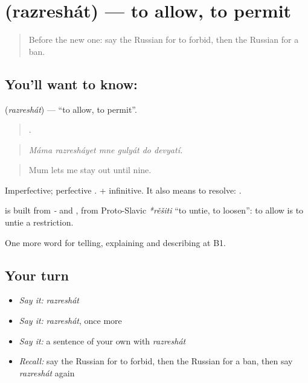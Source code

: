 \section[\texorpdfstring{\ru{разрешать} (razreshát)}{разрешать (razreshát)}]{ (razreshát) — to allow, to permit}

\label{lesson:RU-C389-razreshat}



\begin{quote}
Before the new one: say the Russian for to forbid, then the Russian for a ban.
\end{quote}

\subsection*{You'll want to know: }
\textbf{} (\emph{razreshát}) — \textquotedblleft{}to allow, to permit\textquotedblright{}.

\begin{quote}
     .
\end{quote}

\begin{quote}
\emph{Máma razresháyet mne gulyát do devyatí.}
\end{quote}

\begin{quote}
Mum lets me stay out until nine.
\end{quote}

Imperfective; perfective \emph{}. \emph{ } + infinitive. It also means to resolve: \emph{ }.

\begin{cousinweb}
\textbf{} is built from \emph{-} and \emph{}, from Proto-Slavic \emph{*rěšiti} \textquotedblleft{}to untie, to loosen\textquotedblright{}: to allow is to untie a restriction.
\end{cousinweb}

\begin{grammarlens}[title={What you've built}]
One more word for telling, explaining and describing at B1.
\end{grammarlens}

\subsection*{Your turn}
\begin{itemize}
\raggedright
  \item \emph{Say it:} \emph{razreshát}
  \item \emph{Say it:} \emph{razreshát}, once more
  \item \emph{Say it:} a sentence of your own with \emph{razreshát}
  \item \emph{Recall:} say the Russian for to forbid, then the Russian for a ban, then say \emph{razreshát} again
\end{itemize}

